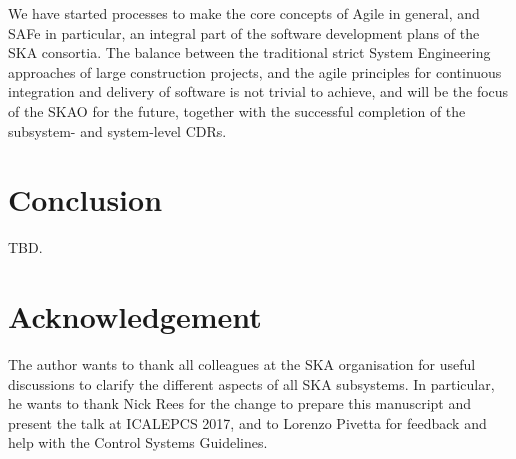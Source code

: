 \documentclass[a4paper,
               biblatex,       %
               keeplastbox,    %
               ]{jacow-2_1}    %
\begin{document}
We have started processes to make the core concepts of Agile in general, and SAFe in particular, an integral part of the software development plans of the SKA consortia. The balance between the traditional strict System Engineering approaches of large construction projects, and the agile principles for continuous integration and delivery of software is not trivial to achieve, and will be the focus of the SKAO for the future, together with the successful completion of the subsystem- and system-level CDRs.


\section{Conclusion} %
\label{sec:conclusion}
TBD.


\section{Acknowledgement} %
\label{sec:acknowledgement}
The author wants to thank all colleagues at the SKA organisation for useful discussions to clarify the different aspects of all SKA subsystems. In particular, he wants to thank Nick Rees for the change to prepare this manuscript and present the talk at ICALEPCS 2017, and to Lorenzo Pivetta for feedback and help with the Control Systems Guidelines.


\label{sec:references}
\printbibliography

\end{document}
